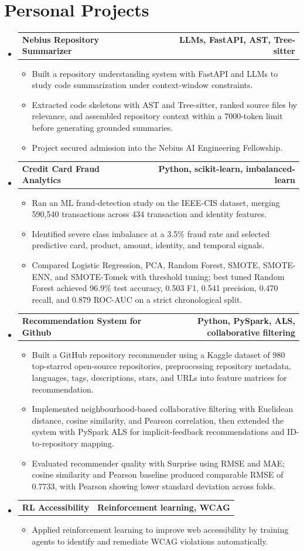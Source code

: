 \documentclass[a4paper,11pt]{article}
\makeatletter
\newcommand{\resumeItem}[1]{
  \item\small{{#1 \vspace{-3pt}}}
}
\newcommand{\resumeProjectHeading}[2]{
  \vspace{-3pt}\item
    \begin{tabular*}{1.0\textwidth}[t]{l@{\extracolsep{\fill}}r}
      \textbf{#1} & \textbf{\small #2} \\
    \end{tabular*}\vspace{-7pt}
}
\newcommand{\resumeSubHeadingListStart}{\begin{itemize}[leftmargin=0.0in, label={}]}
\newcommand{\resumeSubHeadingListEnd}{\end{itemize}}
\newcommand{\resumeItemListStart}{\begin{itemize}}
\newcommand{\resumeItemListEnd}{\end{itemize}\vspace{0pt}}
\makeatother
\begin{document}
\section{Personal Projects}
\resumeSubHeadingListStart
  \resumeProjectHeading{Nebius Repository Summarizer}{LLMs, FastAPI, AST, Tree-sitter}
    \resumeItemListStart
      \resumeItem{Built a repository understanding system with FastAPI and LLMs to study code summarization under context-window constraints.}
      \resumeItem{Extracted code skeletons with AST and Tree-sitter, ranked source files by relevance, and assembled repository context within a 7000-token limit before generating grounded summaries.}
      \resumeItem{Project secured admission into the Nebius AI Engineering Fellowship.}
    \resumeItemListEnd
  \resumeProjectHeading{Credit Card Fraud Analytics}{Python, scikit-learn, imbalanced-learn}
    \resumeItemListStart
      \resumeItem{Ran an ML fraud-detection study on the IEEE-CIS dataset, merging 590,540 transactions across 434 transaction and identity features.}
      \resumeItem{Identified severe class imbalance at a 3.5\% fraud rate and selected predictive card, product, amount, identity, and temporal signals.}
      \resumeItem{Compared Logistic Regression, PCA, Random Forest, SMOTE, SMOTE-ENN, and SMOTE-Tomek with threshold tuning; best tuned Random Forest achieved 96.9\% test accuracy, 0.503 F1, 0.541 precision, 0.470 recall, and 0.879 ROC-AUC on a strict chronological split.}
    \resumeItemListEnd
  \resumeProjectHeading{Recommendation System for Github}{Python, PySpark, ALS, collaborative filtering}
    \resumeItemListStart
      \resumeItem{Built a GitHub repository recommender using a Kaggle dataset of 980 top-starred open-source repositories, preprocessing repository metadata, languages, tags, descriptions, stars, and URLs into feature matrices for recommendation.}
      \resumeItem{Implemented neighbourhood-based collaborative filtering with Euclidean distance, cosine similarity, and Pearson correlation, then extended the system with PySpark ALS for implicit-feedback recommendations and ID-to-repository mapping.}
      \resumeItem{Evaluated recommender quality with Surprise using RMSE and MAE; cosine similarity and Pearson baseline produced comparable RMSE of 0.7733, with Pearson showing lower standard deviation across folds.}
    \resumeItemListEnd
  \resumeProjectHeading{RL Accessibility}{Reinforcement learning, WCAG}
    \resumeItemListStart
      \resumeItem{Applied reinforcement learning to improve web accessibility by training agents to identify and remediate WCAG violations automatically.}
    \resumeItemListEnd
\resumeSubHeadingListEnd
\end{document}
